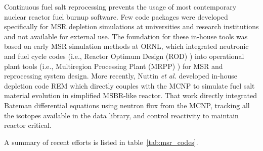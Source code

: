 Continuous fuel salt reprocessing prevents the usage of most contemporary 
nuclear reactor fuel burnup software. Few code packages were developed 
specifically for \gls{MSR} depletion simulations at universities and research 
institutions and not available for external use. The foundation for these 
in-house tools was based on early \gls{MSR} simulation methods at \gls{ORNL}, 
which integrated neutronic and fuel cycle codes (i.e., Reactor Optimum Design 
(ROD) \cite{bauman_rod_1971}) into operational plant tools (i.e., Multiregion 
Processing Plant (MRPP) \cite{kee_mrpp_1976}) for \gls{MSR} and reprocessing 
system design. More recently, Nuttin \emph{et al.} developed in-house 
depletion code REM which directly couples with the \gls{MCNP}  
\cite{noauthor_mcnp_2004} to simulate fuel salt material evolution in 
simplified \gls{MSBR}-like reactor. That work directly integrated
Bateman differential equations using neutron flux from the \gls{MCNP}, 
tracking all the isotopes available in the data library, and control 
reactivity to maintain reactor critical.

A summary of recent efforts is listed in table~\ref{tab:msr_codes}.